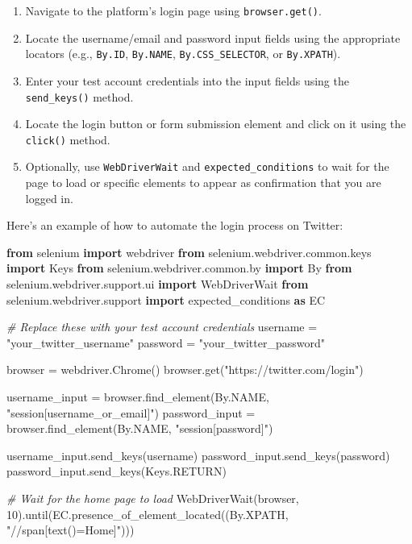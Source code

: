 \documentclass[
  paper=a4,
  ,captions=tableheading
]{scrartcl}
\newenvironment{Shaded}{}{}
\newcommand{\CommentTok}[1]{\textcolor[rgb]{0.38,0.63,0.69}{\textit{#1}}}
\newcommand{\DecValTok}[1]{\textcolor[rgb]{0.25,0.63,0.44}{#1}}
\newcommand{\ImportTok}[1]{\textcolor[rgb]{0.00,0.50,0.00}{\textbf{#1}}}
\newcommand{\NormalTok}[1]{#1}
\newcommand{\OperatorTok}[1]{\textcolor[rgb]{0.40,0.40,0.40}{#1}}
\newcommand{\StringTok}[1]{\textcolor[rgb]{0.25,0.44,0.63}{#1}}
\providecommand{\tightlist}{%
  \setlength{\itemsep}{0pt}\setlength{\parskip}{0pt}}
\begin{document}
\begin{enumerate}
\def\labelenumi{\arabic{enumi}.}
\tightlist
\item
  Navigate to the platform's login page using \texttt{browser.get()}.
\item
  Locate the username/email and password input fields using the
  appropriate locators (e.g., \texttt{By.ID}, \texttt{By.NAME},
  \texttt{By.CSS\_SELECTOR}, or \texttt{By.XPATH}).
\item
  Enter your test account credentials into the input fields using the
  \texttt{send\_keys()} method.
\item
  Locate the login button or form submission element and click on it
  using the \texttt{click()} method.
\item
  Optionally, use \texttt{WebDriverWait} and
  \texttt{expected\_conditions} to wait for the page to load or specific
  elements to appear as confirmation that you are logged in.
\end{enumerate}

Here's an example of how to automate the login process on Twitter:

\begin{Shaded}
\begin{Highlighting}[]
\ImportTok{from}\NormalTok{ selenium }\ImportTok{import}\NormalTok{ webdriver}
\ImportTok{from}\NormalTok{ selenium.webdriver.common.keys }\ImportTok{import}\NormalTok{ Keys}
\ImportTok{from}\NormalTok{ selenium.webdriver.common.by }\ImportTok{import}\NormalTok{ By}
\ImportTok{from}\NormalTok{ selenium.webdriver.support.ui }\ImportTok{import}\NormalTok{ WebDriverWait}
\ImportTok{from}\NormalTok{ selenium.webdriver.support }\ImportTok{import}\NormalTok{ expected\_conditions }\ImportTok{as}\NormalTok{ EC}

\CommentTok{\# Replace these with your test account credentials}
\NormalTok{username }\OperatorTok{=} \StringTok{"your\_twitter\_username"}
\NormalTok{password }\OperatorTok{=} \StringTok{"your\_twitter\_password"}

\NormalTok{browser }\OperatorTok{=}\NormalTok{ webdriver.Chrome()}
\NormalTok{browser.get(}\StringTok{"https://twitter.com/login"}\NormalTok{)}

\NormalTok{username\_input }\OperatorTok{=}\NormalTok{ browser.find\_element(By.NAME, }\StringTok{"session[username\_or\_email]"}\NormalTok{)}
\NormalTok{password\_input }\OperatorTok{=}\NormalTok{ browser.find\_element(By.NAME, }\StringTok{"session[password]"}\NormalTok{)}

\NormalTok{username\_input.send\_keys(username)}
\NormalTok{password\_input.send\_keys(password)}
\NormalTok{password\_input.send\_keys(Keys.RETURN)}

\CommentTok{\# Wait for the home page to load}
\NormalTok{WebDriverWait(browser, }\DecValTok{10}\NormalTok{).until(EC.presence\_of\_element\_located((By.XPATH, }\StringTok{"//span[text()=\textquotesingle{}Home\textquotesingle{}]"}\NormalTok{)))}
\end{Highlighting}
\end{Shaded}
\end{document}
